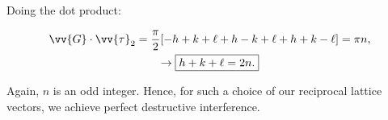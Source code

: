 Doing the dot product:

\begin{gather}
  \vv{G}\cdot\vv{\tau}_2 = \frac{\pi}{2}[-h+k+\ell + h-k+\ell + h+k-\ell] = \pi n, \\
  \rightarrow \boxed{h+k+\ell = 2n.}
\end{gather}

Again, $n$ is an odd integer. Hence, for such a choice of our reciprocal lattice vectors, we achieve perfect destructive interference.


